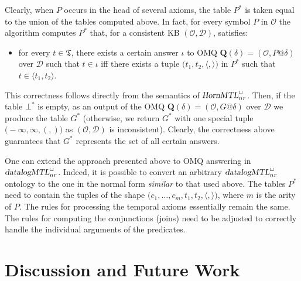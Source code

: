 \documentclass{article}
\newcommand{\omq}{\boldsymbol Q}
\newcommand{\D}{\mathcal{D}}
\renewcommand{\O}{\mathcal{O}}
\newcommand{\hMTL}{\textsl{HornMTL}}
\newcommand{\dMTL}{\textsl{datalogMTL}}
\begin{document}
{{\smallskip
Clearly, when $P$ occurs in the head of several axioms, the table $P^*$ is taken equal to the union of the tables computed above. In fact, for every symbol $P$ in $\O$ the algorithm computes $P^*$ that, for a consistent KB $(\O, \D)$, satisfies:
%
\begin{itemize}
\item for every $t \in \mathfrak{T}$, there exists a certain answer $\iota$ to OMQ $\omq(\delta) = (\O,P@\delta)$ over $\D$ such that $t \in \iota$ iff there exists a tuple $\bigl( t_1, t_2, \langle, \rangle \bigr)$ in $P^*$ such that $t \in \langle t_1, t_2 \rangle$.
\end{itemize}
%
This correctness follows directly from the semantics of $\hMTL^\Box_{nr}$. Then, if the table $\bot^*$ is empty, as an output of the OMQ $\omq(\delta) = (\O,G@\delta)$ over $\D$ we produce the table $G^*$ (otherwise, we return $G^*$ with one special tuple $\bigl( -\infty, \infty, (,) \bigr)$ as $(\O, \D)$ is inconsistent). Clearly, the correctness above guarantees that $G^*$ represents the set of all certain answers.

One can extend the approach presented above to OMQ answering in
$\dMTL^\Box_{nr}$. Indeed, it is possible to convert an arbitrary
$\dMTL^\Box_{nr}$ ontology to the one in the normal form
\emph{similar} to that used above. The tables $P^*$ need to contain
the tuples of the shape
$\bigl( c_1, \dots, c_m, t_1, t_2, \langle, \rangle\bigr)$, where $m$
is the arity of $P$. The rules for processing the temporal axioms
essentially remain the same. The rules for computing the conjunctions
(joins) need to be adjusted to correctly handle the individual
arguments of the predicates.

\section{Discussion and Future Work}


}}
\end{document}

